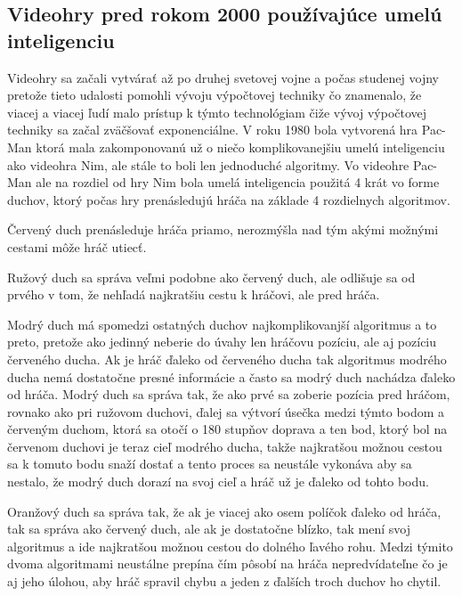 \documentclass[10pt,oneside,slovak,a4paper]{article}
\begin{document}
\subsection{Videohry pred rokom 2000 používajúce umelú inteligenciu} \label{kapitola2.2}
Videohry sa začali vytvárať až po druhej svetovej vojne a počas studenej vojny pretože tieto udalosti pomohli vývoju výpočtovej techniky čo znamenalo, že viacej a viacej ľudí malo prístup k týmto technológiam čiže vývoj výpočtovej techniky sa začal zväčšovať exponenciálne. V roku 1980 bola vytvorená hra Pac-Man ktorá mala zakomponovanú už o niečo komplikovanejšiu umelú inteligenciu ako videohra Nim, ale stále to boli len jednoduché algoritmy. Vo videohre Pac-Man ale na rozdiel od hry Nim bola umelá inteligencia použitá 4 krát vo forme duchov, ktorý počas hry prenásledujú hráča na základe 4 rozdielnych algoritmov. \cite{PacmanAI}

Červený duch prenásleduje hráča priamo, nerozmýšla nad tým akými možnými cestami môže hráč utiecť.

Ružový duch sa správa veľmi podobne ako červený duch, ale odlišuje sa od prvého v tom, že nehľadá najkratšiu cestu k hráčovi, ale pred hráča.

Modrý duch má spomedzi ostatných duchov najkomplikovanjší algoritmus a to preto, pretože ako jedinný neberie do úvahy len hráčovu pozíciu, ale aj pozíciu červeného ducha. Ak je hráč ďaleko od červeného ducha tak algoritmus modrého ducha nemá dostatočne presné informácie a často sa modrý duch nachádza ďaleko od hráča. Modrý duch sa správa tak, že ako prvé sa zoberie pozícia pred hráčom, rovnako ako pri ružovom duchovi, ďalej sa výtvorí úsečka medzi týmto bodom a červeným duchom, ktorá sa otočí o 180 stupňov doprava a ten bod, ktorý bol na červenom duchovi je teraz cieľ modrého ducha, takže najkratšou možnou cestou sa k tomuto bodu snaží dostať a tento proces sa neustále vykonáva aby sa nestalo, že modrý duch dorazí na svoj cieľ a hráč už je ďaleko od tohto bodu.

Oranžový duch sa správa tak, že ak je viacej ako osem políčok ďaleko od hráča, tak sa správa ako červený duch, ale ak je dostatočne blízko, tak mení svoj algoritmus a ide najkratšou možnou cestou do dolného ľavého rohu. Medzi týmito dvoma algoritmami neustálne prepína čím pôsobí na hráča nepredvídateľne čo je aj jeho úlohou, aby hráč spravil chybu a jeden z ďalších troch duchov ho chytil.
\end{document}
